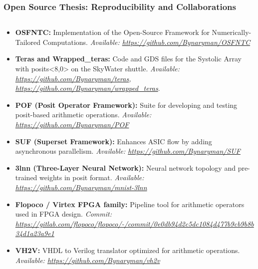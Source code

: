 \begin{frame}
\frametitle{Open Source Thesis: Reproducibility and Collaborations}
\scriptsize
\begin{columns} %

\begin{column}{0.75\textwidth} %
\begin{itemize}
    \item \textbf{OSFNTC:} Implementation of the Open-Source Framework for Numerically-Tailored Computations. \textit{Available: \url{https://github.com/Bynaryman/OSFNTC}}
    \item \textbf{Teras and Wrapped\_teras:} Code and GDS files for the Systolic Array with posits<8,0> on the SkyWater shuttle. \textit{Available: \url{https://github.com/Bynaryman/teras}, \url{https://github.com/Bynaryman/wrapped\_teras}}.
    \item \textbf{POF (Posit Operator Framework):} Suite for developing and testing posit-based arithmetic operations. \textit{Available: \url{https://github.com/Bynaryman/POF}}
    \item \textbf{SUF (Superset Framework):} Enhances ASIC flow by adding asynchronous parallelism. \textit{Available: \url{https://github.com/Bynaryman/SUF}}
    \item \textbf{3lnn (Three-Layer Neural Network):} Neural network topology and pre-trained weights in posit format. \textit{Available: \url{https://github.com/Bynaryman/mnist-3lnn}}
    \item \textbf{Flopoco / Virtex FPGA family:} Pipeline tool for arithmetic operators used in FPGA design. \textit{Commit: \url{https://gitlab.com/flopoco/flopoco/-/commit/0e0db94d2c5dc1084d477b9cb9b8b34d1a23a9e1}}
    \item \textbf{VH2V:} VHDL to Verilog translator optimized for arithmetic operations. \textit{Available: \url{https://github.com/Bynaryman/vh2v}}
\end{itemize}
\end{column}


\end{columns}
\end{frame}
